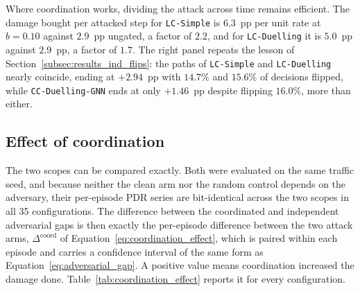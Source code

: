 Where coordination works, dividing the attack across time remains efficient. The
damage bought per attacked step for \texttt{LC-Simple} is $6.3$~pp per unit rate at
$b = 0.10$ against $2.9$~pp ungated, a factor of $2.2$, and for \texttt{LC-Duelling} it
is $5.0$~pp against $2.9$~pp, a factor of $1.7$. The right panel repeats the lesson of
Section~\ref{subsec:results_ind_flips}: the paths of \texttt{LC-Simple} and
\texttt{LC-Duelling} nearly coincide, ending at $+2.94$~pp with $14.7\%$ and $15.6\%$ of
decisions flipped, while \texttt{CC-Duelling-GNN} ends at only $+1.46$~pp despite
flipping $16.0\%$, more than either.

\subsection{Effect of coordination}
\label{subsec:results_coordination_effect}

The two scopes can be compared exactly. Both were evaluated on the same traffic seed,
and because neither the clean arm nor the random control depends on the adversary,
their per-episode PDR series are bit-identical across the two scopes in all 35
configurations. The difference between the coordinated and independent adversarial
gaps is then exactly the per-episode difference between the two attack arms,
$\Delta^{\text{coord}}$ of Equation~\eqref{eq:coordination_effect}, which is paired
within each episode and carries a confidence interval of the same form as
Equation~\eqref{eq:adversarial_gap}. A positive value means coordination increased the
damage done. Table~\ref{tab:coordination_effect} reports it for every configuration.

